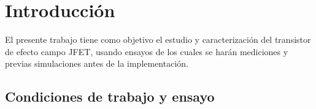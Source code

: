\section{Introducción}
\sangria{} El presente trabajo tiene como objetivo el estudio y caracterización del transistor de efecto campo JFET, usando ensayos de los cuales se harán mediciones y previas simulaciones antes de la implementación.

\subsection{Condiciones de trabajo y ensayo}

